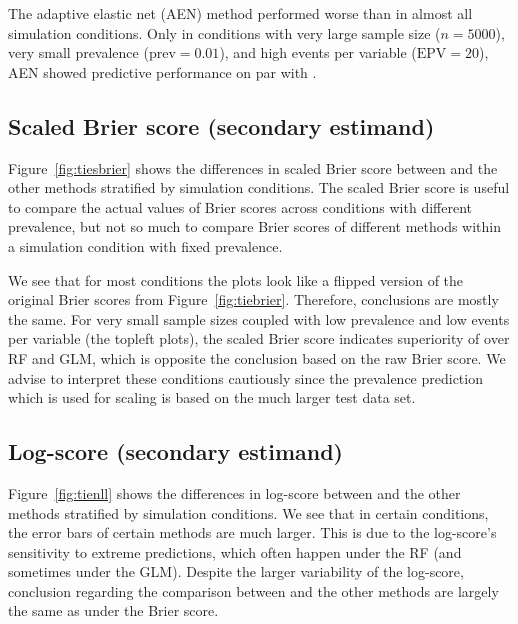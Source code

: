 The adaptive elastic net (AEN) method performed worse than \ainet{} in almost
all simulation conditions. Only in conditions with very large sample size
($n = 5000$), very small prevalence ($\mbox{prev} = 0.01$), and high events per
variable ($\mbox{EPV} = 20$), AEN showed predictive performance on par with
\ainet{}.

\subsection{Scaled Brier score (secondary estimand)}
Figure~\ref{fig:tiesbrier} shows the differences in scaled Brier score between
\ainet{} and the other methods stratified by simulation conditions. The scaled
Brier score is useful to compare the actual values of Brier scores across
conditions with different prevalence, but not so much to compare Brier scores of
different methods within a simulation condition with fixed prevalence.

We see that for most conditions the plots look like a flipped version of the
original Brier scores from Figure~\ref{fig:tiebrier}. Therefore, conclusions are
mostly the same. For very small sample sizes coupled with low prevalence and low
events per variable (the topleft plots), the scaled Brier score indicates
superiority of \ainet{} over RF and GLM, which is opposite the conclusion based
on the raw Brier score. We advise to interpret these conditions cautiously since
the prevalence prediction which is used for scaling is based on the much larger
test data set.

\subsection{Log-score (secondary estimand)}
Figure~\ref{fig:tienll} shows the differences in log-score between \ainet{} and
the other methods stratified by simulation conditions. We see that in certain
conditions, the error bars of certain methods are much larger. This is due to
the log-score's sensitivity to extreme predictions, which often happen under the
RF (and sometimes under the GLM). Despite the larger variability of the log-score,
conclusion regarding the comparison between \ainet{} and the other
methods are largely the same as under the Brier score.

